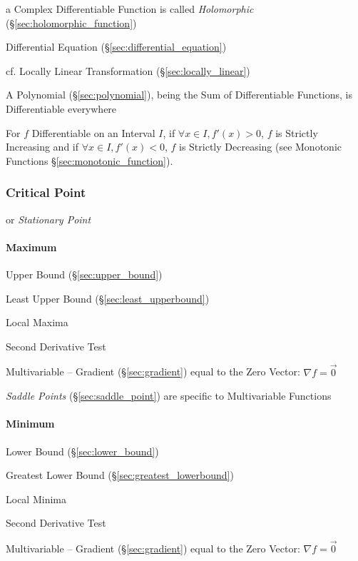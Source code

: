 a Complex Differentiable Function is called \emph{Holomorphic}
(\S\ref{sec:holomorphic_function})

\fist Differential Equation (\S\ref{sec:differential_equation})

\fist cf. Locally Linear Transformation (\S\ref{sec:locally_linear})

A Polynomial (\S\ref{sec:polynomial}), being the Sum of Differentiable
Functions, is Differentiable everywhere

For $f$ Differentiable on an Interval $I$, if $\forall x \in I, f'(x)
> 0$, $f$ is Strictly Increasing and if $\forall x \in I, f'(x) < 0$,
$f$ is Strictly Decreasing (see Monotonic Functions
\S\ref{sec:monotonic_function}).



\subsubsection{Critical Point}\label{sec:critical_point}

or \emph{Stationary Point}



\paragraph{Maximum}\label{sec:maximum}\hfill

Upper Bound (\S\ref{sec:upper_bound})

Least Upper Bound (\S\ref{sec:least_upperbound})

Local Maxima

Second Derivative Test

Multivariable -- Gradient (\S\ref{sec:gradient}) equal to the Zero Vector:
$\nabla{f} = \vec{0}$

\fist \emph{Saddle Points} (\S\ref{sec:saddle_point}) are specific to
Multivariable Functions



\paragraph{Minimum}\label{sec:minimum}\hfill

Lower Bound (\S\ref{sec:lower_bound})

Greatest Lower Bound (\S\ref{sec:greatest_lowerbound})

Local Minima

Second Derivative Test

Multivariable -- Gradient (\S\ref{sec:gradient}) equal to the Zero Vector:
$\nabla{f} = \vec{0}$

